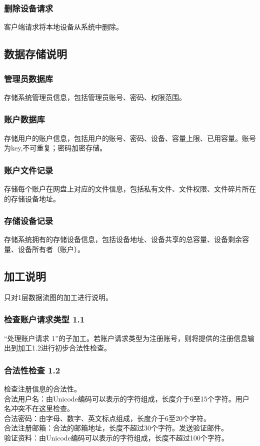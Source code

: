 \subsubsection{删除设备请求}
客户端请求将本地设备从系统中删除。

\subsection{数据存储说明}
\subsubsection{管理员数据库}
存储系统管理员信息，包括管理员账号、密码、权限范围。

\subsubsection{账户数据库}
存储用户的账户信息，包括用户的账号、密码、设备、容量上限、已用容量。账号为key,不可重复；密码加密存储。

\subsubsection{账户文件记录}
存储每个账户在网盘上对应的文件信息，包括私有文件、文件权限、文件碎片所在的存储设备地址。

\subsubsection{存储设备记录}
存储系统拥有的存储设备信息，包括设备地址、设备共享的总容量、设备剩余容量、设备所有者（账户）。



\subsection{加工说明}
只对1层数据流图的加工进行说明。
\subsubsection{检查账户请求类型 1.1}
“处理账户请求 1”的子加工。若账户请求类型为注册账号，则将提供的注册信息输出到加工1.2进行初步合法性检查。

\subsubsection{合法性检查 1.2}
检查注册信息的合法性。\\
合法用户名：由Unicode编码可以表示的字符组成，长度介于6至15个字符。用户名冲突不在这里检查。\\
合法密码：由字母、数字、英文标点组成，长度介于6至20个字符。\\
合法注册邮箱：合法的邮箱地址，长度不超过30个字符。发送验证邮件。\\
验证资料：由Unicode编码可以表示的字符组成，长度不超过100个字符。\\

